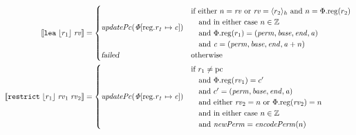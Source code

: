 \documentclass{article}
\newcommand{\update}[2]{[#1 \mapsto #2]}
\newcommand{\sem}[1]{\left\llbracket #1 \right\rrbracket}
\newcommand{\var}[1]{\mathit{#1}}
\newcommand{\rv}{\var{rv}}
\newcommand{\pcreg}{\mathrm{pc}}
\newcommand{\addr}{\var{a}}
\newcommand{\start}{\var{base}}
\newcommand{\addrend}{\var{end}}
\newcommand{\perm}{\var{perm}}
\newcommand{\stdcap}[1][\perm]{\left(#1,\start,\addrend,\addr \right)}
\newcommand{\plainproj}[1]{\mathrm{#1}}
\newcommand{\memreg}[1][\Phi]{#1.\plainproj{reg}}
\newcommand{\updateReg}[3][\Phi]{#1\update{\plainproj{reg}.#2}{#3}}
\newcommand{\failed}{\textsl{failed}}
\newcommand{\plainfun}[1]{\mathit{#1}}
\newcommand{\encodePerm}{\plainfun{encodePerm}}
\newcommand{\stdUpdatePc}[1]{\plainfun{updatePc(#1)}}
\newcommand{\ints}{\mathbb{Z}}
\newcommand{\refreg}[1]{\lfloor #1 \rfloor}
\newcommand{\refheap}[1]{\langle #1 \rangle_h}
\newcommand{\instr}[1]{\mathtt{#1}}
\newcommand{\twoinstr}[3]{\instr{#1} \; #2 \; #3}
\newcommand{\lea}[2]{\twoinstr{lea}{#1}{#2}}
\newcommand{\threeinstr}[4]{\instr{#1} \; #2 \; #3 \; #4}
\newcommand{\restrict}[3]{\threeinstr{restrict}{#1}{#2}{#3}}
\begin{document}
\begin{align*}
  \sem{\lea{\refreg{r_1}}{\rv}}            & =
                                             \begin{cases}
                                               \stdUpdatePc{\updateReg{r_1}{\var{c}}} &
                                                 \arraycolsep=0pt
                                                 \begin{array}{l}
                                                   \text{if either $n = \rv$ or $\rv = \refheap{r_2}$ and $n = \memreg(r_2)$} \\
                                                   \quad\text{and in either case $n \in \ints $} \\
                                                   \quad\text{and $\memreg(r_1) = \stdcap$}\\
                                                   \quad\text{and $\var{c} = (\perm,\start,\addrend,\addr + n)$}
                                                 \end{array}\\
                                               \failed               & \text{otherwise}
                                             \end{cases} 
\\ %
  \sem{\restrict{\refreg{r_1}}{\rv_1}{\rv_2}}           & =
                                             \begin{cases}
                                               \stdUpdatePc{\updateReg{r_1}{\var{c}}}  &
                                                 \arraycolsep=0pt
                                                 \begin{array}{l}
                                                   \text{if $r_1 \neq \pcreg$}\\
                                                   \quad\text{and $\memreg(\rv_1) = c'$}\\
                                                   \quad\text{and $c' = \stdcap$}\\
                                                   \quad\text{and either $\rv_2 = n$ or $\memreg(\rv_2) = n$}\\
                                                   \quad\text{and in either case $n \in \ints$}\\
                                                   \quad\text{and $\var{newPerm} = \encodePerm(n)$}\\

\end{array}
\end{cases}
\end{align*}
\end{document}
